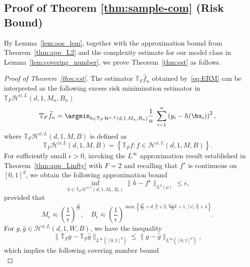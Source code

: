 \documentclass[11pt]{article}
\begin{document}
\subsection{Proof of Theorem \ref{thm:sample-com} (Risk Bound)}
By Lemma~\ref{lem:aos_lem}, together with the approximation bound from Theorem~\ref{thm:app_L2} and the complexity estimate for our model class in Lemma~\ref{lem:covering_number}, we prove Theorem~\ref{thm:est} as follows.
\begin{proof}[Proof of Theorem~\ref{thm:est}] The estimator $\mathbb{T}_{F} \widehat{f}_n$ obtained by~\eqref{eq:ERM} can be interpreted as the following excess risk minimization estimator in  $\mathbb{T}_{F} \mathcal{H}^{\phi,L}(d, 1, M_n, B_n)$
\begin{equation*}
    \mathbb{T}_{F} \widehat{f}_n = \argmin_{h \in \mathbb{T}_{F} \mathcal{H}^{\phi,L}(d, 1, M_n, B_n)} \frac{1}{n} \; \sum_{i=1}^n \left(y_i - h(\bx_i)\right)^2,
\end{equation*}
where $\mathbb{T}_{F} \mathcal{H}^{\phi,L}(d, 1, M, B)$ is defined as 
\begin{equation*}
    \mathbb{T}_{F} \mathcal{H}^{\phi,L}(d, 1, M, B) = \left\{ \mathbb{T}_{F} f: f \in \mathcal{H}^{\phi,L}(d, 1, M, B) \right\}.
\end{equation*}
For sufficiently small $\epsilon>0$, invoking the $L^{\infty}$ approximation result established in Theorem~\ref{thm:app_Linfty} with $F = 2$ and recalling that $f^{\star}$ is continuous on $[0,1]^d$, 
we obtain the following approximation bound 
\begin{equation}
    \inf_{h \in \mathbb{T}_{F} \mathcal{H}^{\phi,7}(d, 1, M_{\epsilon}, B_\epsilon) } \|h - f^{\star}\|_{L^2(\rho)} \leq \epsilon,
    \label{eq:app-TF}
\end{equation}
provided that
\begin{equation*}
     M_{\epsilon} \eqsim \left( \frac{1}{\epsilon}\right)^{\frac{d}{2s}}, \quad B_{\epsilon} \eqsim \left( \frac{1}{\epsilon}\right)^{\max \left\{ \frac{d^2}{2s}+d, \frac{d}{s}+2, \frac{d+4}{2s}+1, \lceil s \rceil, \frac{6}{s}+4\right\}}.
\end{equation*}
For $g, \widehat{g} \in \mathcal{H}^{\phi,L}(d, 1, W, B)$, we have the inequality 
\begin{equation*}
    \|\mathbb{T}_{F} g - \mathbb{T}_{F} \widehat{g}\|_{L^{\infty}([0,1]^d)} \leq \|g  - \widehat{g}\|_{L^{\infty}([0,1]^d)},
\end{equation*}
which implies the following covering number bound
\begin{equation}

\end{equation}
\end{proof}
\end{document}
